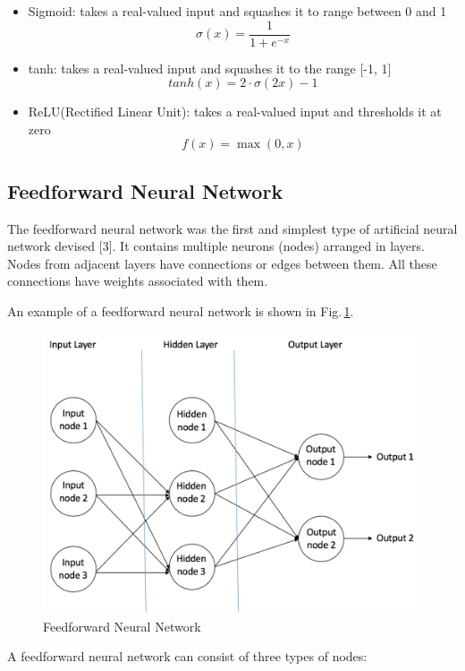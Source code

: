 \begin{itemize}
  \item Sigmoid: takes a real-valued input and squashes it to range between 0 and 1
        $$ \sigma(x) =  \frac{\mathrm{1} }{\mathrm{1} + e^{-x} }  $$ 
  \item tanh: takes a real-valued input and squashes it to the range [-1, 1]
        $$ tanh(x) = 2\cdot\sigma(2x)-1 $$
        
  \item ReLU(Rectified Linear Unit): takes a real-valued input and thresholds it at zero
        $$f(x) = \max(0,x)$$
\end{itemize}

\subsection{Feedforward Neural Network}
The feedforward neural network was the first and simplest type of artificial neural network devised [3]. It contains multiple neurons (nodes) arranged in layers. Nodes from adjacent layers have connections or edges between them. All these connections have weights associated with them.

An example of a feedforward neural network is shown in Fig.\,\ref{feedforward}.
\begin{figure}
	\centering
	\includegraphics[scale=0.5]{Figs/feedforward.png}
    \caption{Feedforward Neural Network}
    \label{feedforward}
\end{figure}

A feedforward neural network can consist of three types of nodes:

